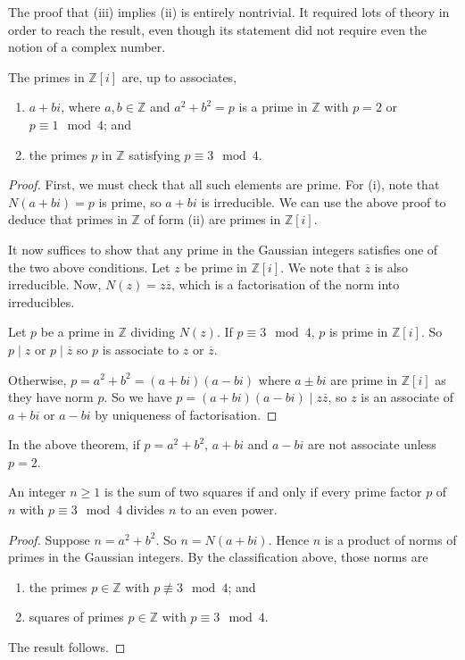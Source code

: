 \begin{remark}
	The proof that (iii) implies (ii) is entirely nontrivial.
	It required lots of theory in order to reach the result, even though its statement did not require even the notion of a complex number.
\end{remark}
\begin{theorem}
	The primes in $\mathbb Z[i]$ are, up to associates,
	\begin{enumerate}
		\item $a + bi$, where $a, b \in \mathbb Z$ and $a^2 + b^2 = p$ is a prime in $\mathbb Z$ with $p = 2$ or $p \equiv 1 \mod 4$; and
		\item the primes $p$ in $\mathbb Z$ satisfying $p \equiv 3 \mod 4$.
	\end{enumerate}
\end{theorem}
\begin{proof}
	First, we must check that all such elements are prime.
	For (i), note that $N(a+bi) = p$ is prime, so $a+bi$ is irreducible.
	We can use the above proof to deduce that primes in $\mathbb Z$ of form (ii) are primes in $\mathbb Z[i]$.

	It now suffices to show that any prime in the Gaussian integers satisfies one of the two above conditions.
	Let $z$ be prime in $\mathbb Z[i]$.
	We note that $\overline z$ is also irreducible.
	Now, $N(z) = z\overline z$, which is a factorisation of the norm into irreducibles.

	Let $p$ be a prime in $\mathbb Z$ dividing $N(z)$.
	If $p \equiv 3 \mod 4$, $p$ is prime in $\mathbb Z[i]$.
	So $p \mid z$ or $p \mid \overline z$ so $p$ is associate to $z$ or $\overline z$.

	Otherwise, $p = a^2 + b^2 = (a+bi)(a-bi)$ where $a \pm bi$ are prime in $\mathbb Z[i]$ as they have norm $p$.
	So we have $p = (a+bi)(a-bi) \mid z \overline z$, so $z$ is an associate of $a+bi$ or $a-bi$ by uniqueness of factorisation.
\end{proof}
\begin{remark}
	In the above theorem, if $p = a^2 + b^2$, $a+bi$ and $a-bi$ are not associate unless $p = 2$.
\end{remark}
\begin{corollary}
	An integer $n \geq 1$ is the sum of two squares if and only if every prime factor $p$ of $n$ with $p \equiv 3 \mod 4$ divides $n$ to an even power.
\end{corollary}
\begin{proof}
	Suppose $n = a^2 + b^2$.
	So $n = N(a+bi)$.
	Hence $n$ is a product of norms of primes in the Gaussian integers.
	By the classification above, those norms are
	\begin{enumerate}
		\item the primes $p \in \mathbb Z$ with $p \not\equiv 3 \mod 4$; and
		\item squares of primes $p \in \mathbb Z$ with $p \equiv 3 \mod 4$.
	\end{enumerate}
	The result follows.
\end{proof}
